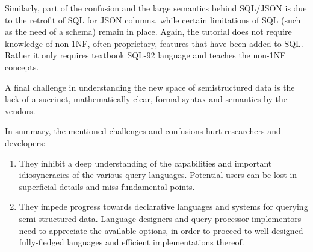 Similarly, part of the confusion and the large semantics behind SQL/JSON is due to the retrofit of SQL for JSON columns, while certain limitations of SQL (such as the need of a schema) remain in place. Again, the tutorial does not require knowledge of non-1NF, often proprietary, features that have been added to SQL. Rather it only requires textbook SQL-92 language and teaches the non-1NF concepts.

A final challenge in understanding the new space of semistructured data is the lack of a succinct, mathematically clear, formal syntax and semantics by the vendors. 

In summary, the mentioned challenges and confusions hurt researchers and developers:

\begin{enumerate}
\item They inhibit a deep understanding of the capabilities and important idiosyncracies of the various query languages. Potential users can be lost in superficial details and miss fundamental points.
\item They impede progress towards declarative languages and systems for querying semi-structured data. Language designers and query processor implementors need to appreciate the available options, in order to proceed to well-designed fully-fledged languages and efficient implementations thereof. 
\end{enumerate}


